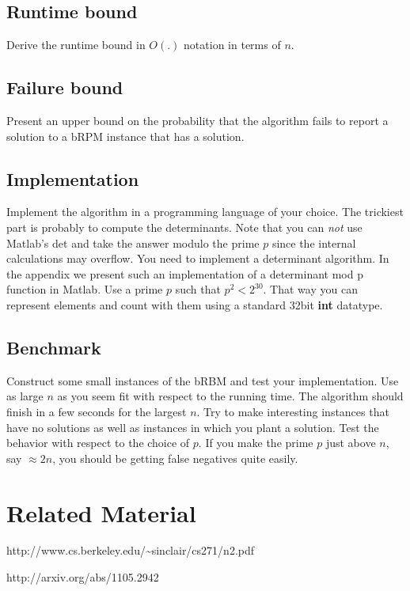 \documentclass{tufte-handout}
\begin{document}
\subsection*{Runtime bound}
Derive the runtime bound in $O(.)$ notation in terms of $n$.
\subsection*{Failure bound}
Present an upper bound on the probability that the algorithm fails to report a solution to a bRPM instance that has a solution.
\subsection*{Implementation}
Implement the algorithm in a programming language of your choice. The trickiest part is probably to compute the determinants. Note that you can \emph{not} use Matlab's det and take the answer modulo the prime $p$ since the internal calculations may overflow. You need to implement a determinant algorithm.
In the appendix we present such an implementation of a determinant mod p function in Matlab.
Use a prime $p$ such that $p^2<2^{30}$. That way you can represent elements and count with them using a standard 32bit \textbf{int} datatype.

\subsection*{Benchmark}
Construct some small instances of the bRBM and test your implementation. Use as large $n$ as you seem fit with respect to the running time. The algorithm should finish in a few seconds for the largest $n$.  Try to make interesting instances that have no solutions as well as instances in which you plant a solution. Test the behavior with respect to the choice of $p$. If you make the prime $p$ just above $n$, say $\approx 2n$,  you should be getting false negatives quite easily.

\section*{Related Material}
\noindent [S11] http://www.cs.berkeley.edu/\textasciitilde sinclair/cs271/n2.pdf

\noindent [Hu11] http://arxiv.org/abs/1105.2942
\end{document}
